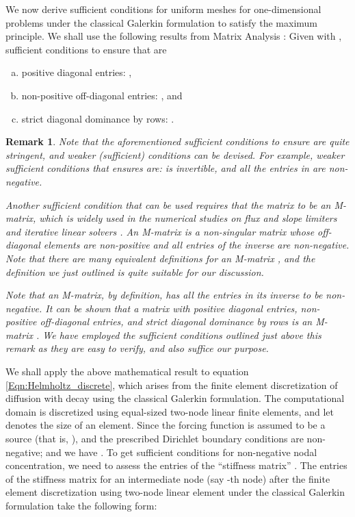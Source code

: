 \documentclass[11pt]{amsart}
\newtheorem{remark}[theorem]{Remark}
\begin{document}
We now derive sufficient conditions for uniform meshes for one-dimensional problems under 
the classical Galerkin formulation to satisfy the maximum principle. We shall use the following 
results from Matrix Analysis \cite{Quarteroni_Numerical_Mathematics,Varga_Matrix_Iterative_Analysis}: 
Given  with , 
sufficient conditions to ensure that  are
\begin{enumerate}[(a)]
  \item positive diagonal entries: , 
  \item non-positive off-diagonal entries: , and 
  \item strict diagonal dominance by rows: .
\end{enumerate}
\begin{remark}
Note that the aforementioned sufficient conditions to ensure  
are quite stringent, and weaker (sufficient) conditions can be devised. For example, weaker sufficient 
conditions that ensures  are:  is invertible, 
and all the entries in  are non-negative. 

Another sufficient condition that can be used requires that the matrix  to 
be an M-matrix, which is widely used in the numerical studies on flux and slope limiters 
\cite{Kuzmin_Turek_JCP_2002_v175_p525} and iterative linear solvers \cite{Saad}. An M-matrix 
is a non-singular matrix whose off-diagonal elements are non-positive and all entries of the 
inverse  are non-negative. Note that there are many equivalent definitions 
for an M-matrix \cite{Saad,Varga_Matrix_Iterative_Analysis}, and the definition we just outlined 
is quite suitable for our discussion. 

Note that an M-matrix, by definition, has all the entries in its inverse to be non-negative. 
It can be shown that a matrix with positive diagonal entries, non-positive off-diagonal entries, 
and strict diagonal dominance by rows is an M-matrix \cite{Quarteroni_Numerical_Mathematics}. 
We have employed the sufficient conditions outlined just above this remark as they are easy to 
verify, and also suffice our purpose. 
\end{remark}

We shall apply the above mathematical result to equation \eqref{Eqn:Helmholtz_discrete}, 
which arises from the finite element discretization of diffusion with decay using the classical 
Galerkin formulation. The computational domain is discretized using equal-sized two-node 
linear finite elements, and let  denotes the size of an element. Since the forcing function 
is assumed to be a source (that is, ), and the prescribed Dirichlet 
boundary conditions are non-negative; and we have . 
To get sufficient conditions for non-negative nodal concentration, we need to assess the entries 
of the ``stiffness matrix'' .  The entries of the stiffness matrix for an intermediate 
node (say -th node) after the finite element discretization using two-node linear element under 
the classical Galerkin formulation take the following form:
\end{document}
